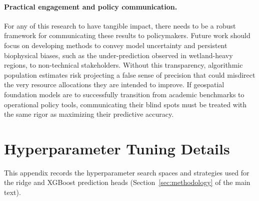 \documentclass[12pt,letterpaper]{article}
\begin{document}
\paragraph{Practical engagement and policy communication.}
For any of this research to have tangible impact, there needs to be a robust framework for communicating these results to policymakers. Future work should focus on developing methods to convey model uncertainty and persistent biophysical biases, such as the under-prediction observed in wetland-heavy regions, to non-technical stakeholders. Without this transparency, algorithmic population estimates risk projecting a false sense of precision that could misdirect the very resource allocations they are intended to improve. If geospatial foundation models are to successfully transition from academic benchmarks to operational policy tools, communicating their blind spots must be treated with the same rigor as maximizing their predictive accuracy.

\newpage


\printbibliography[heading=bibintoc,title={References}]


\newpage


\appendix
\section{Hyperparameter Tuning Details}
\label{app:hyperparameters}

This appendix records the hyperparameter search spaces and strategies used for the ridge and XGBoost prediction heads (Section~\ref{sec:methodology} of the main text).
\end{document}
